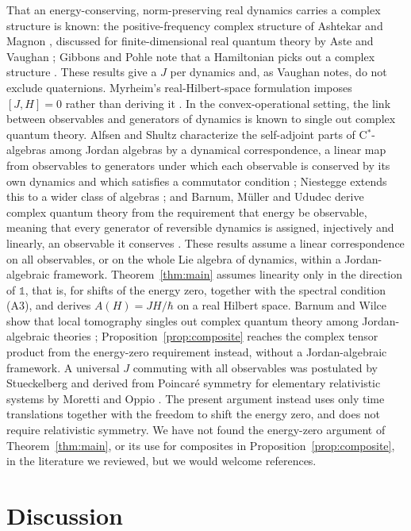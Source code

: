 \documentclass[11pt]{article}
\theoremstyle{remark}
\newcommand{\one}{\mathbb{1}}
\begin{document}
That an energy-conserving, norm-preserving real dynamics carries a complex structure is known: the positive-frequency complex structure of Ashtekar and Magnon \cite{AshtekarMagnon}, discussed for finite-dimensional real quantum theory by Aste \cite{Aste} and Vaughan \cite{Vaughan}; Gibbons and Pohle note that a Hamiltonian picks out a complex structure \cite{GibbonsPohle}. These results give a $J$ per dynamics and, as Vaughan notes, do not exclude quaternions. Myrheim's real-Hilbert-space formulation imposes $[J,H]=0$ rather than deriving it \cite{Myrheim}. In the convex-operational setting, the link between observables and generators of dynamics is known to single out complex quantum theory. Alfsen and Shultz characterize the self-adjoint parts of C$^*$-algebras among Jordan algebras by a dynamical correspondence, a linear map from observables to generators under which each observable is conserved by its own dynamics and which satisfies a commutator condition \cite{AlfsenShultz}; Niestegge extends this to a wider class of algebras \cite{Niestegge}; and Barnum, M\"uller and Ududec derive complex quantum theory from the requirement that energy be observable, meaning that every generator of reversible dynamics is assigned, injectively and linearly, an observable it conserves \cite{BMU}. These results assume a linear correspondence on all observables, or on the whole Lie algebra of dynamics, within a Jordan-algebraic framework. Theorem~\ref{thm:main} assumes linearity only in the direction of $\one$, that is, for shifts of the energy zero, together with the spectral condition (A3), and derives $A(H)=JH/\hbar$ on a real Hilbert space. Barnum and Wilce show that local tomography singles out complex quantum theory among Jordan-algebraic theories \cite{BarnumWilce}; Proposition~\ref{prop:composite} reaches the complex tensor product from the energy-zero requirement instead, without a Jordan-algebraic framework. A universal $J$ commuting with all observables was postulated by Stueckelberg \cite{Stueckelberg} and derived from Poincar\'e symmetry for elementary relativistic systems by Moretti and Oppio \cite{MorettiOppio}. The present argument instead uses only time translations together with the freedom to shift the energy zero, and does not require relativistic symmetry. We have not found the energy-zero argument of Theorem~\ref{thm:main}, or its use for composites in Proposition~\ref{prop:composite}, in the literature we reviewed, but we would welcome references.

\section{Discussion}
\end{document}
